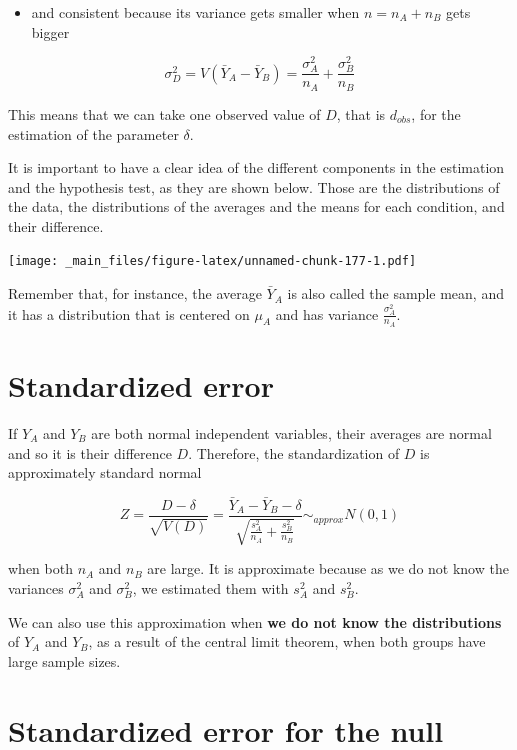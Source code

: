 \documentclass[
]{book}
\providecommand{\tightlist}{%
  \setlength{\itemsep}{0pt}\setlength{\parskip}{0pt}}
\begin{document}
\begin{itemize}
\tightlist
\item
  and consistent because its variance gets smaller when \(n=n_A+n_B\) gets bigger
\end{itemize}

\[\sigma_D^2=V(\bar{Y}_A-\bar{Y}_B)=\frac{\sigma^2_A}{n_A}+\frac{\sigma^2_B}{n_B}\]

This means that we can take one observed value of \(D\), that is \(d_{obs}\), for the estimation of the parameter \(\delta\).

It is important to have a clear idea of the different components in the estimation and the hypothesis test, as they are shown below. Those are the distributions of the data, the distributions of the averages and the means for each condition, and their difference.

\texttt{[image: \_main\_files/figure-latex/unnamed-chunk-177-1.pdf]}

Remember that, for instance, the average \(\bar{Y}_A\) is also called the sample mean, and it has a distribution that is centered on \(\mu_A\) and has variance \(\frac{\sigma_A^2}{n_A}\).

\hypertarget{standardized-error}{%
\section{Standardized error}\label{standardized-error}}

If \(Y_A\) and \(Y_B\) are both normal independent variables, their averages are normal and so it is their difference \(D\). Therefore, the standardization of \(D\) is approximately standard normal

\[Z=\frac{D-\delta}{\sqrt{V(D)}}=\frac{\bar{Y}_A-\bar{Y}_B -\delta}{\sqrt{\frac{s^2_A}{n_A}+\frac{s^2_B}{n_B}}} \sim_{approx} N(0,1)\]

when both \(n_A\) and \(n_B\) are large. It is approximate because as we do not know the variances \(\sigma^2_A\) and \(\sigma^2_B\), we estimated them with \(s_A^2\) and \(s_B^2\).

We can also use this approximation when \textbf{we do not know the distributions} of \(Y_A\) and \(Y_B\), as a result of the central limit theorem, when both groups have large sample sizes.

\hypertarget{standardized-error-for-the-null}{%
\section{Standardized error for the null}\label{standardized-error-for-the-null}}
\end{document}
